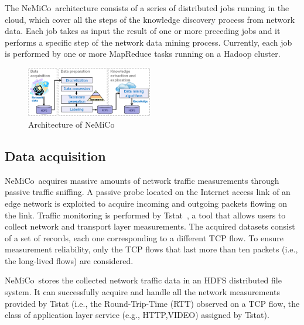 \documentclass[conference]{IEEEtran}
\newcommand{\Nemico}{{\sc NeMiCo}}
\begin{document}
The \Nemico\ architecture consists of a series of distributed jobs running in the cloud, which cover all the steps of the knowledge discovery process from network data.
Each job takes as input the result of one or more preceding jobs and it performs a specific step of the network data mining process.
Currently, each job is performed by one or more MapReduce tasks running on a Hadoop cluster.


\begin{figure}
\centering
\includegraphics[width=0.49\textwidth]{Framework.eps}
\caption{Architecture of \Nemico}
\label{fig:arch}
\end{figure}



\subsection{Data acquisition}
\label{Netacq}

\Nemico\ acquires massive amounts of network traffic measurements through passive traffic sniffing.
A passive probe located on the Internet access link of an edge network is exploited to acquire incoming and outgoing packets flowing on the link.
Traffic monitoring is performed by Tstat~\cite{Tstat}, a tool that allows users to collect network and transport layer measurements. 
The acquired datasets consist of a set of records, each one corresponding to a different TCP flow.
To ensure measurement reliability, only the TCP flows that last more than ten packets (i.e., the long-lived flows) are considered.

\Nemico\ stores the collected network traffic data in an HDFS distributed file
system.  It can successfully acquire and handle all the network measurements provided by Tstat (i.e., the Round-Trip-Time (RTT) observed on a TCP flow, the class of application layer service (e.g., HTTP,VIDEO) assigned by Tstat). 

\end{document}
